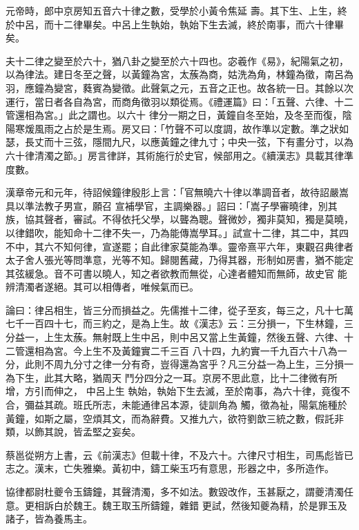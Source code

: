 \begin{pinyinscope}
 元帝時，郎中京房知五音六十律之數，受學於小黃令焦延
 壽。其下生、上生，終於中呂，而十二律畢矣。中呂上生執始，執始下生去滅，終於南事，而六十律畢矣。



 夫十二律之變至於六十，猶八卦之變至於六十四也。宓羲作《易》，紀陽氣之初，以為律法。建日冬至之聲，以黃鐘為宮，太蔟為商，姑洗為角，林鐘為徵，南呂為羽，應鐘為變宮，蕤賓為變徵。此聲氣之元，五音之正也。故各統一日。其餘以次運行，當日者各自為宮，而商角徵羽以類從焉。《禮運篇》曰：「五聲、六律、十二管還相為宮。」此之謂也。以六十
 律分一期之日，黃鐘自冬至始，及冬至而復，陰陽寒煖風雨之占於是生焉。房又曰：「竹聲不可以度調，故作準以定數。準之狀如瑟，長丈而十三弦，隱間九尺，以應黃鐘之律九寸；中央一弦，下有畫分寸，以為六十律清濁之節。」房言律詳，其術施行於史官，候部用之。《續漢志》具載其律準度數。



 漢章帝元和元年，待詔候鐘律殷肜上言：「官無曉六十律以準調音者，故待詔嚴嵩具以準法教子男宣，願召
 宣補學官，主調樂器。」詔曰：「嵩子學審曉律，別其族，協其聲者，審試。不得依托父學，以聾為聰。聲微妙，獨非莫知，獨是莫曉，以律錯吹，能知命十二律不失一，乃為能傳嵩學耳。」試宣十二律，其二中，其四不中，其六不知何律，宣遂罷；自此律家莫能為準。靈帝熹平六年，東觀召典律者太子舍人張光等問準意，光等不知。歸閱舊藏，乃得其器，形制如房書，猶不能定其弦緩急。音不可書以曉人，知之者欲教而無從，心達者體知而無師，故史官
 能辨清濁者遂絕。其可以相傳者，唯候氣而已。





 論曰：律呂相生，皆三分而損益之。先儒推十二律，從子至亥，每三之，凡十七萬七千一百四十七，而三約之，是為上生。故《漢志》云：三分損一，下生林鐘，三分益一，上生太蔟。無射既上生中呂，則中呂又當上生黃鐘，然後五聲、六律、十二管還相為宮。今上生不及黃鐘實二千三百
 八十四，九約實一千九百六十八為一分，此則不周九分寸之律一分有奇，豈得還為宮乎？凡三分益一為上生，三分損一為下生，此其大略，猶周天
 鬥分四分之一耳。京房不思此意，比十二律微有所增，方引而伸之，
 中呂上生
 執始，執始下生去滅，至於南事，為六十律，竟復不合，彌益其疏。班氏所志，未能通律呂本源，徒訓角為
 觸，徵為祉，陽氣施種於黃鐘，如斯之屬，空煩其文，而為辭費。又推九六，欲符劉歆三統之數，假託非類，以飾其說，皆孟堅之妄矣。



 蔡邕從朔方上書，云《前漢志》但載十律，不及六十。六律尺寸相生，司馬彪皆已志之。漢末，亡失雅樂。黃初中，鑄工柴玉巧有意思，形器之中，多所造作。



 協律都尉杜夔令玉鑄鐘，其聲清濁，多不如法。數毀改作，玉甚厭之，謂夔清濁任意。更相訴白於魏王。魏王取玉所鑄鐘，雜錯
 更試，然後知夔為精，於是罪玉及諸子，皆為養馬主。




\end{pinyinscope}
